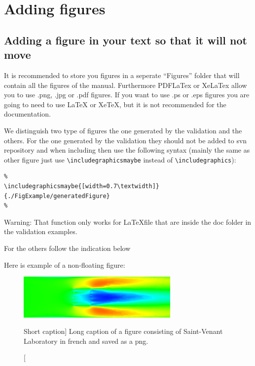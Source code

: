 \chapter{Adding figures}

\section[Short section title]{Adding a figure in your text so that it will not move}

It is recommended to store you figures in a seperate ``Figures'' folder that
will contain all the figures of the manual. Furthermore PDFLaTex or XeLaTex
allow you to use .png, .jpg or .pdf figures. If you want to use .ps or .eps
figures you are going to need to use LaTeX or XeTeX, but it is not recommended
for the \telemacsystem{} documentation.

We distinguish two type of figures the one generated by the validation and the
others. For the one generated by the validation they should not be added to svn
repository and when including then use the following syntax (mainly the same as
other figure just use \verb!\includegraphicsmaybe! instead of
\verb!\includegraphics!):
\begin{verbatim}
%
\includegraphicsmaybe{[width=0.7\textwidth]}{./FigExample/generatedFigure}
%
\end{verbatim}
%
\begin{WarningBlock}{Warning:}
That function only works for \LaTeX file that are inside the doc folder in the
validation examples.
\end{WarningBlock}

For the others follow the indication below

Here is example of a non-floating figure:

\begin{figure}[H]%
\begin{center}
%
  \includegraphics[width=0.7\textwidth]{./FigExample/ExampleImage}
%
\end{center}
\caption
[Short caption]
{Long caption of a figure consisting of Saint-Venant Laboratory in french and
saved as a png\protect\footnotemark.}
\label{fig:ExampleImage}
\end{figure}

